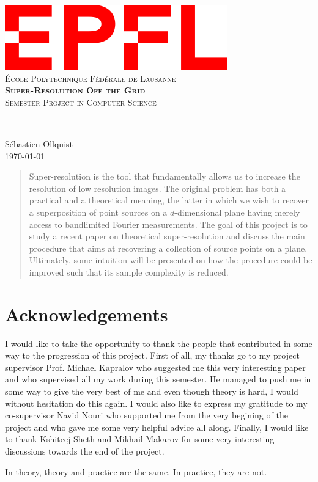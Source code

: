 \documentclass[11pt,titlepage]{report}
\begin{document}
\begin{titlepage}
	\centering
    \includegraphics[width=0.5\linewidth]{images/EPFL.png}\\[0.25cm] 	%
    \textsc{\LARGE École Polytechnique Fédérale de Lausanne}\\ \vspace{\fill}
    \textbf{\textsc{\fontsize{30}{30}\selectfont Super-Resolution Off the Grid}}\\ \vspace{\fill}		
	\textsc{\LARGE Semester Project in Computer Science}\\[0.4cm]
	\rule{\linewidth}{0.2 mm} \\[0.5 cm]
	Sébastien Ollquist \\[2cm] \today
\end{titlepage}
\restoregeometry

\thispagestyle{numberonly}
\begin{abstract}
    Super-resolution is the tool that fundamentally allows us to increase the resolution of low resolution images. The original problem has both a practical and a theoretical meaning, the latter in which we wish to recover a superposition of point sources on a $d$-dimensional plane having merely access to bandlimited Fourier measurements. The goal of this project is to study a recent paper on theoretical super-resolution and discuss the main procedure that aims at recovering a collection of source points on a plane. Ultimately, some intuition will be presented on how the procedure could be improved such that its sample complexity is reduced.
\end{abstract}
\chapter*{Acknowledgements}
I would like to take the opportunity to thank the people that contributed in some way to the progression of this project. First of all, my thanks go to my project supervisor Prof. Michael Kapralov who suggested me this very interesting paper and who supervised all my work during this semester. He managed to push me in some way to give the very best of me and even though theory is hard, I would without hesitation do this again. I would also like to express my gratitude to my co-supervisor Navid Nouri who supported me from the very begining of the project and who gave me some very helpful advice all along. Finally, I would like to thank Kshiteej Sheth and Mikhail Makarov for some very interesting discussions towards the end of the project.
\vspace*{2cm}
\begin{fquote}
    In theory, theory and practice are the same. In practice, they are not.
\end{fquote} 
\newpage
\end{document}
